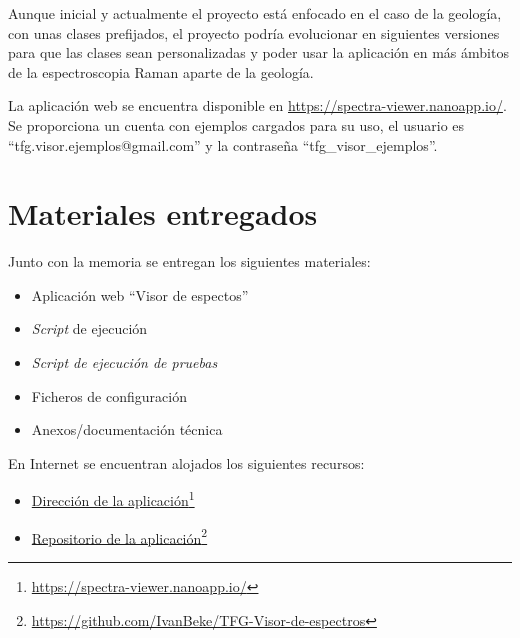 Aunque inicial y actualmente el proyecto está enfocado en el caso de la
geología, con unas clases prefijados, el proyecto podría evolucionar en
siguientes versiones para que las clases sean personalizadas y poder usar la
aplicación en más ámbitos de la espectroscopia Raman aparte de la geología.

La aplicación web se encuentra disponible en
\url{https://spectra-viewer.nanoapp.io/}. Se proporciona un cuenta con ejemplos
cargados para su uso, el usuario es ``tfg.visor.ejemplos@gmail.com'' y la
contraseña ``tfg\_visor\_ejemplos''.

\section{Materiales entregados}

Junto con la memoria se entregan los siguientes materiales:
\begin{itemize}
	\tightlist	
	\item Aplicación web ``Visor de espectos''
	\item \textit{Script} de ejecución
	\item \textit{Script de ejecución de pruebas}
	\item Ficheros de configuración
	\item Anexos/documentación técnica
\end{itemize}
En Internet se encuentran alojados los siguientes recursos:
\begin{itemize}
	\tightlist	
	\item \href{https://spectra-viewer.nanoapp.io/}{Dirección de la
		aplicación}\footnote{\url{https://spectra-viewer.nanoapp.io/}}
	\item \href{https://github.com/IvanBeke/TFG-Visor-de-espectros}{Repositorio de
		la
		aplicación}\footnote{\url{https://github.com/IvanBeke/TFG-Visor-de-espectros}}
\end{itemize}
